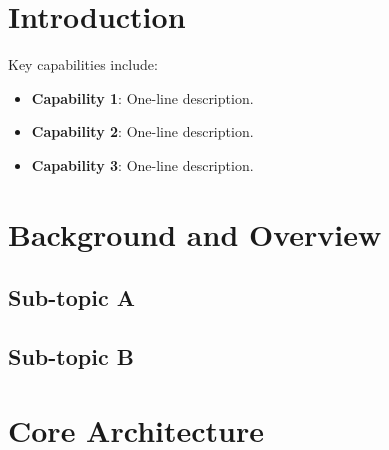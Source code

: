 \documentclass[12pt, a4paper]{article}
\begin{document}
\lipsum[1]   %

\newpage

\section{Introduction}

\lipsum[2]   %

Key capabilities include:
\begin{itemize}
    \item \textbf{Capability 1}: One-line description.
    \item \textbf{Capability 2}: One-line description.
    \item \textbf{Capability 3}: One-line description.
\end{itemize}

\section{Background and Overview}

\lipsum[3]   %

\subsection{Sub-topic A}
\lipsum[4]

\subsection{Sub-topic B}
\lipsum[5]

\section{Core Architecture}
\end{document}

